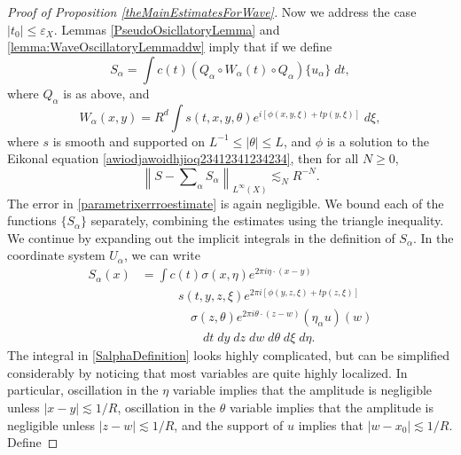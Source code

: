 \begin{proof}[Proof of Proposition \ref{theMainEstimatesForWave}]
Now we address the case $|t_0| \leq \varepsilon_X$. Lemmas \ref{PseudoOsicllatoryLemma} and \ref{lemma:WaveOscillatoryLemmaddw} imply that if we define
%
\begin{equation}
    S\!_\alpha = \int c(t) (Q_\alpha \circ W_\alpha(t) \circ Q_\alpha) \{ u_\alpha \}\; dt,
\end{equation}
%
where $Q_\alpha$ is as above, and
%
\[ W_\alpha(x,y) = R^d \int s(t,x,y,\theta) e^{i [ \phi(x,y,\xi) + t p(y,\xi) ]}\; d\xi, \]
%
where $s$ is smooth and supported on $L^{-1} \leq |\theta| \leq L$, and $\phi$ is a solution to the Eikonal equation \eqref{awiodjawoidhjioq23412341234234}, then for all $N \geq 0$,
%
\begin{equation} \label{parametrixerrroestimate}
    \left\| S - \textstyle\sum\nolimits_\alpha S\!_\alpha \right\|_{L^\infty(X)} \lesssim_N R^{-N}.
\end{equation}
%
%
%
The error in \eqref{parametrixerrroestimate} is again negligible. We bound each of the functions $\{ S\!_\alpha \}$ separately, combining the estimates using the triangle inequality. We continue by expanding out the implicit integrals in the definition of $S\!_\alpha$. In the coordinate system $U_\alpha$, we can write
%
\begin{equation} \label{SalphaDefinition}
\begin{split}
    S\!_\alpha(x) &= \int c(t) \sigma(x,\eta) e^{2 \pi i \eta \cdot (x - y)}\\[-6 pt]
    &\quad\quad\quad s(t,y,z,\xi) e^{2 \pi i [ \phi(y,z,\xi) + t p(z,\xi) ]}\\
    &\quad\quad\quad\quad \sigma(z,\theta) e^{2 \pi i \theta \cdot (z - w)} (\eta_\alpha u)(w)\\
    &\quad\quad\quad\quad\quad dt\; dy\; dz\; dw\; d\theta\; d\xi\; d\eta.
\end{split}
\end{equation}
%
The integral in \eqref{SalphaDefinition} looks highly complicated, but can be simplified considerably by noticing that most variables are quite highly localized. In particular, oscillation in the $\eta$ variable implies that the amplitude is negligible unless $|x - y| \lesssim 1/R$, oscillation in the $\theta$ variable implies that the amplitude is negligible unless $|z - w| \lesssim 1/R$, and the support of $u$ implies that $|w - x_0| \lesssim 1/R$. Define

\end{proof}
